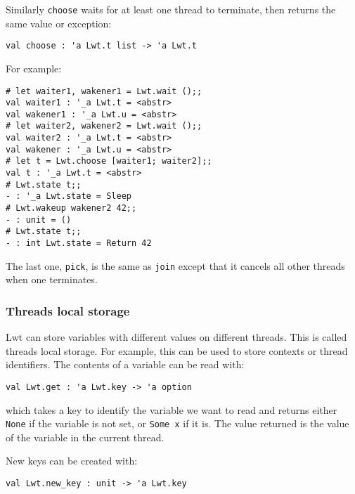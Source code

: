Similarly {\tt choose} waits for at least one thread to
terminate, then returns the same value or exception:



\lstset{language=[Objective]Caml}\begin{lstlisting}
val choose : 'a Lwt.t list -> 'a Lwt.t
\end{lstlisting}
\medskip

\noindent
For example:



\lstset{language=[Objective]Caml}\begin{lstlisting}
# let waiter1, wakener1 = Lwt.wait ();;
val waiter1 : '_a Lwt.t = <abstr>
val wakener1 : '_a Lwt.u = <abstr>
# let waiter2, wakener2 = Lwt.wait ();;
val waiter2 : '_a Lwt.t = <abstr>
val wakener : '_a Lwt.u = <abstr>
# let t = Lwt.choose [waiter1; waiter2];;
val t : '_a Lwt.t = <abstr>
# Lwt.state t;;
- : '_a Lwt.state = Sleep
# Lwt.wakeup wakener2 42;;
- : unit = ()
# Lwt.state t;;
- : int Lwt.state = Return 42
\end{lstlisting}
\medskip

\noindent
The last one, {\tt pick}, is the same as {\tt join} except that it cancels
all other threads when one terminates.



\subsubsection{ Threads local storage }

Lwt can store variables with different values on different
threads. This is called threads local storage. For example, this can
be used to store contexts or thread identifiers. The contents of a
variable can be read with:



\lstset{language=[Objective]Caml}\begin{lstlisting}
val Lwt.get : 'a Lwt.key -> 'a option
\end{lstlisting}
\medskip

\noindent
which takes a key to identify the variable we want to read and
returns either {\tt None} if the variable is not set, or
{\tt Some x} if it is. The value returned is the value of the
variable in the current thread.



New keys can be created with:



\lstset{language=[Objective]Caml}\begin{lstlisting}
val Lwt.new_key : unit -> 'a Lwt.key
\end{lstlisting}
\medskip

